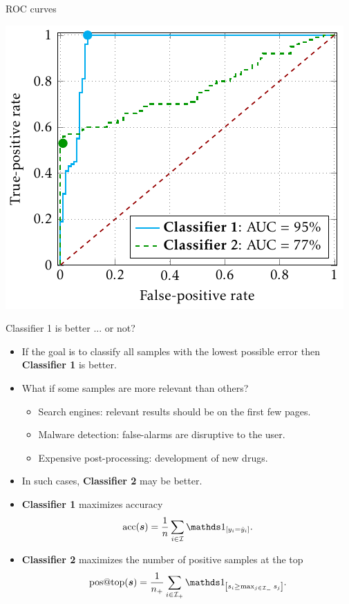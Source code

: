 \documentclass[10pt, aspectratio=169]{beamer}
\begin{document}
\begin{frame}{ROC curves}
  \begin{center}
    \includegraphics[width=\linewidth, height=0.9\textheight, keepaspectratio]{
      ../images/roc_space_presentation.pdf
    }
  \end{center}
\end{frame}

\begin{frame}{Classifier 1 is better ... or not?}
  \begin{itemize}
    \item<1-> If the goal is to classify all samples with the lowest possible error then \textbf{Classifier 1} is better.
    \item<2-> What if some samples are more relevant than others?
    \begin{itemize}
      \item Search engines: relevant results should be on the first few pages.
      \item Malware detection: false-alarms are disruptive to the user.
      \item Expensive post-processing: development of new drugs.
    \end{itemize}
    \item<3-> In such cases, \textbf{Classifier 2} may be better.
    \item<4-> \textbf{Classifier 1} maximizes accuracy
    \begin{equation*}
      \accuracy(\bm{s}) = \frac{1}{\nall} \sum_{i \in \I} \Iverson{y_i = \hat{y}_i}.
    \end{equation*}
    \item<4-> \textbf{Classifier 2} maximizes the number of positive samples at the top
    \begin{equation*}
      \postop(\bm{s}) = \frac{1}{\npos} \sum_{i \in \Ipos} \Iverson{s_i \geq \max_{j \in \Ineg}s_j}.
    \end{equation*}
  \end{itemize}
\end{frame}
\end{document}
